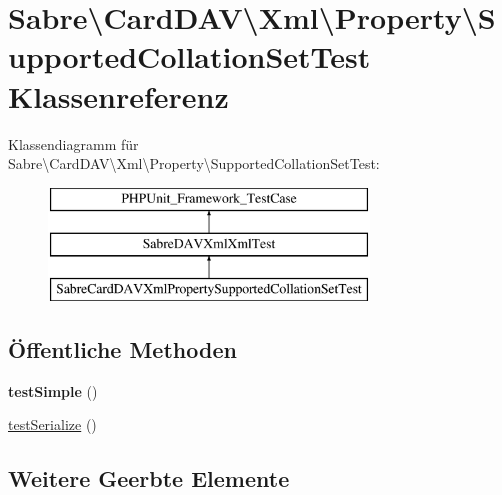 \hypertarget{class_sabre_1_1_card_d_a_v_1_1_xml_1_1_property_1_1_supported_collation_set_test}{}\section{Sabre\textbackslash{}Card\+D\+AV\textbackslash{}Xml\textbackslash{}Property\textbackslash{}Supported\+Collation\+Set\+Test Klassenreferenz}
\label{class_sabre_1_1_card_d_a_v_1_1_xml_1_1_property_1_1_supported_collation_set_test}
Klassendiagramm für Sabre\textbackslash{}Card\+D\+AV\textbackslash{}Xml\textbackslash{}Property\textbackslash{}Supported\+Collation\+Set\+Test\+:\begin{figure}[H]
\begin{center}
\leavevmode
\includegraphics[height=3.000000cm]{class_sabre_1_1_card_d_a_v_1_1_xml_1_1_property_1_1_supported_collation_set_test}
\end{center}
\end{figure}
\subsection*{Öffentliche Methoden}
\begin{DoxyCompactItemize}
\item 
\mbox{\label{class_sabre_1_1_card_d_a_v_1_1_xml_1_1_property_1_1_supported_collation_set_test_ab3cf88b7cb0496820cbf7bc128639659}} 
{\bfseries test\+Simple} ()
\item 
\mbox{\hyperlink{class_sabre_1_1_card_d_a_v_1_1_xml_1_1_property_1_1_supported_collation_set_test_af49e871b5135d63e5b50e0e038313091}{test\+Serialize}} ()
\end{DoxyCompactItemize}
\subsection*{Weitere Geerbte Elemente}


